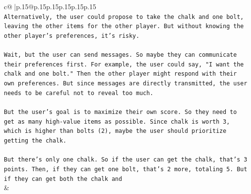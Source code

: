 \documentclass{article}
\begin{document}
{\begin{supertabular}{c@{$\;$}|p{.15\linewidth}@{}p{.15\linewidth}p{.15\linewidth}p{.15\linewidth}p{.15\linewidth}p{.15\linewidth}}
{{{\\ 
\texttt{Alternatively, the user could propose to take the chalk and one bolt, leaving the other items for the other player. But without knowing the other player's preferences, it's risky.} \\
\\ 
\texttt{Wait, but the user can send messages. So maybe they can communicate their preferences first. For example, the user could say, "I want the chalk and one bolt." Then the other player might respond with their own preferences. But since messages are directly transmitted, the user needs to be careful not to reveal too much.} \\
\\ 
\texttt{But the user's goal is to maximize their own score. So they need to get as many high{-}value items as possible. Since chalk is worth 3, which is higher than bolts (2), maybe the user should prioritize getting the chalk.} \\
\\ 
\texttt{But there's only one chalk. So if the user can get the chalk, that's 3 points. Then, if they can get one bolt, that's 2 more, totaling 5. But if they can get both the chalk and} \\
            }
        }
    }
    & \\ \\


\end{supertabular}}
\end{document}
